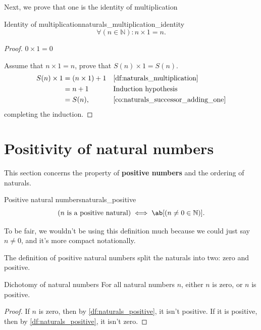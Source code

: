 Next, we prove that one is the identity of multiplication
\begin{lemma}{Identity of multiplication}{naturals_multiplication_identity}
  \begin{equation*}
    \forall (n \in \mathbb{N}) : n \times 1 = n.
  \end{equation*}
\end{lemma}
\begin{proof}
  \basecase \(0 \times 1 = 0\)

  \inductivestep Assume that \(n \times 1 = n\), prove that \(S(n) \times 1 = S(n)\).
  \begin{align}
    S(n) \times 1 & = (n \times 1) + 1 &  & \text{\Cref{df:naturals_multiplication}}       \\
                  & = n + 1            &  & \text{Induction hypothesis}                    \\
                  & = S(n),            &  & \text{\Cref{co:naturals_successor_adding_one}}
  \end{align}
  completing the induction.
\end{proof}

\section{Positivity of natural numbers}
\label{sec:naturals_positivity}

This section concerns the property of \textbf{positive numbers} and the ordering of naturals.
\begin{df}{Positive natural numbers}{naturals_positive}
  \begin{equation*}
    (n \textrm{ is a positive natural}) \iff \ab[(n \neq 0 \in \mathbb{N})].
  \end{equation*}
\end{df}
To be fair, we wouldn't be using this definition much because we could just say \(n \neq 0\), and
it's more compact notationally.

The definition of positive natural numbers split the naturals into two: zero and positive.
\begin{cor}{Dichotomy of natural numbers}{}
  For all natural numbers \(n\), either \(n\) is zero, or \(n\) is positive.
\end{cor}
\begin{proof}
  If \(n\) is zero, then by \cref{df:naturals_positive}, it isn't positive. If it is positive, then
  by \cref{df:naturals_positive}, it isn't zero.
\end{proof}

